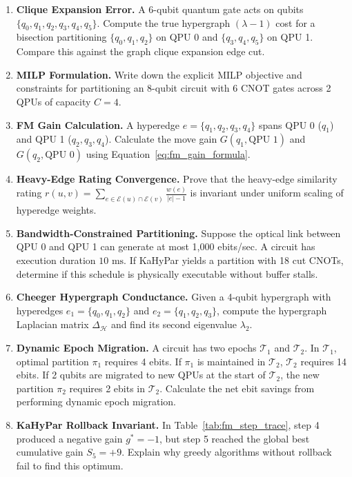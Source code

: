 \begin{enumerate}[label=\textbf{5.\arabic*.}]
    \item \textbf{Clique Expansion Error.} A 6-qubit quantum gate acts on qubits $\{q_0, q_1, q_2, q_3, q_4, q_5\}$. Compute the true hypergraph $(\lambda - 1)$ cost for a bisection partitioning $\{q_0, q_1, q_2\}$ on QPU 0 and $\{q_3, q_4, q_5\}$ on QPU 1. Compare this against the graph clique expansion edge cut.
    
    \item \textbf{MILP Formulation.} Write down the explicit MILP objective and constraints for partitioning an 8-qubit circuit with 6 CNOT gates across 2 QPUs of capacity $C = 4$.
    
    \item \textbf{FM Gain Calculation.} A hyperedge $e = \{q_1, q_2, q_3, q_4\}$ spans QPU 0 ($q_1$) and QPU 1 ($q_2, q_3, q_4$). Calculate the move gain $G(q_1, \text{QPU 1})$ and $G(q_2, \text{QPU 0})$ using Equation~\ref{eq:fm_gain_formula}.
    
    \item \textbf{Heavy-Edge Rating Convergence.} Prove that the heavy-edge similarity rating $r(u, v) = \sum_{e \in \mathcal{E}(u) \cap \mathcal{E}(v)} \frac{w(e)}{|e| - 1}$ is invariant under uniform scaling of hyperedge weights.
    
    \item \textbf{Bandwidth-Constrained Partitioning.} Suppose the optical link between QPU 0 and QPU 1 can generate at most 1,000 ebits/sec. A circuit has execution duration $10\text{ ms}$. If KaHyPar yields a partition with 18 cut CNOTs, determine if this schedule is physically executable without buffer stalls.
    
    \item \textbf{Cheeger Hypergraph Conductance.} Given a 4-qubit hypergraph with hyperedges $e_1 = \{q_0, q_1, q_2\}$ and $e_2 = \{q_1, q_2, q_3\}$, compute the hypergraph Laplacian matrix $\Delta_{\mathcal{H}}$ and find its second eigenvalue $\lambda_2$.
    
    \item \textbf{Dynamic Epoch Migration.} A circuit has two epochs $\mathcal{T}_1$ and $\mathcal{T}_2$. In $\mathcal{T}_1$, optimal partition $\pi_1$ requires 4 ebits. If $\pi_1$ is maintained in $\mathcal{T}_2$, $\mathcal{T}_2$ requires 14 ebits. If 2 qubits are migrated to new QPUs at the start of $\mathcal{T}_2$, the new partition $\pi_2$ requires 2 ebits in $\mathcal{T}_2$. Calculate the net ebit savings from performing dynamic epoch migration.
    
    \item \textbf{KaHyPar Rollback Invariant.} In Table~\ref{tab:fm_step_trace}, step 4 produced a negative gain $g^* = -1$, but step 5 reached the global best cumulative gain $S_5 = +9$. Explain why greedy algorithms without rollback fail to find this optimum.
\end{enumerate}
